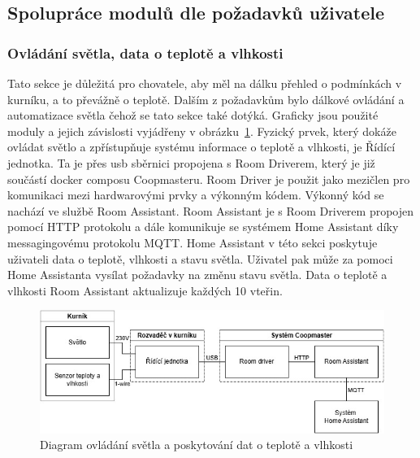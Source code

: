 \subsection{Spolupráce modulů dle požadavků uživatele}\label{subsec:schematicka-vyjadreni-zavislosti-jednotlivych-modulu}

\subsubsection{Ovládání světla, data o teplotě a vlhkosti}
Tato sekce je důležitá pro chovatele, aby měl na dálku přehled o podmínkách v kurníku, a to převážně o teplotě.
Dalším z požadavkům bylo dálkové ovládání a automatizace světla čehož se tato sekce také dotýká.
Graficky jsou použité moduly a jejich závislosti vyjádřeny v obrázku~\ref{fig:svetlo_teplo_vlhkost}.\newline
Fyzický prvek, který dokáže ovládat světlo a zpřístupňuje systému informace o teplotě a vlhkosti, je Řídící jednotka.
Ta je přes usb sběrnici propojena s Room Driverem, který je již součástí docker composu Coopmasteru.
Room Driver je použit jako mezičlen pro komunikaci mezi hardwarovými prvky a výkonným kódem.
Výkonný kód se nachází ve službě Room Assistant.
Room Assistant je s Room Driverem propojen pomocí HTTP protokolu a dále komunikuje se systémem Home Assistant díky messagingovému protokolu MQTT.
Home Assistant v této sekci poskytuje uživateli data o teplotě, vlhkosti a stavu světla.
Uživatel pak může za pomoci Home Assistanta vysílat požadavky na změnu stavu světla.
Data o teplotě a vlhkosti Room Assistant aktualizuje každých 10 vteřin.
\begin{figure}[h]
    \centering
    \includegraphics[width=\textwidth]{img/svetlo_teplo_vlhkost}
    \caption{Diagram ovládání světla a poskytování dat o teplotě a vlhkosti}
    \label{fig:svetlo_teplo_vlhkost}
\end{figure}

